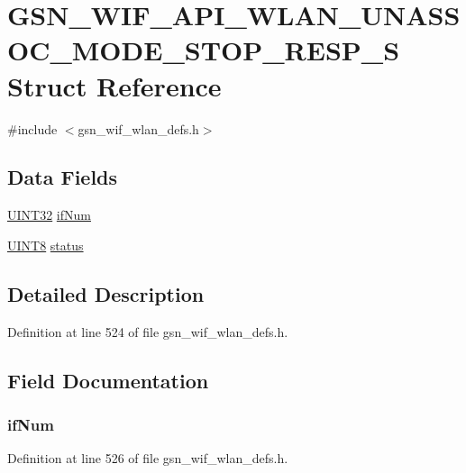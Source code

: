 \hypertarget{a00317}{
\section{GSN\_\-WIF\_\-API\_\-WLAN\_\-UNASSOC\_\-MODE\_\-STOP\_\-RESP\_\-S Struct Reference}
\label{a00317}
}


{\ttfamily \#include $<$gsn\_\-wif\_\-wlan\_\-defs.h$>$}

\subsection*{Data Fields}
\begin{DoxyCompactItemize}
\item 
\hyperlink{a00660_gae1e6edbbc26d6fbc71a90190d0266018}{UINT32} \hyperlink{a00317_ab582fd779b13f74e06e2491389a60aa0}{ifNum}
\item 
\hyperlink{a00660_gab27e9918b538ce9d8ca692479b375b6a}{UINT8} \hyperlink{a00317_ac4f6d5d1544a8d2c1309479ffe1b61ab}{status}
\end{DoxyCompactItemize}


\subsection{Detailed Description}


Definition at line 524 of file gsn\_\-wif\_\-wlan\_\-defs.h.



\subsection{Field Documentation}
\hypertarget{a00317_ab582fd779b13f74e06e2491389a60aa0}{
\subsubsection[{ifNum}]{ {\bf ifNum}}}
\label{a00317_ab582fd779b13f74e06e2491389a60aa0}


Definition at line 526 of file gsn\_\-wif\_\-wlan\_\-defs.h.


